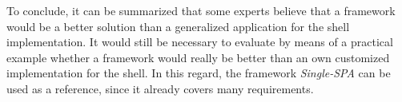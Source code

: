 To conclude, it can be summarized that some experts believe that a framework would be a better solution than a generalized application for the shell implementation.
It would still be necessary to evaluate by means of a practical example whether a framework would really be better than an own customized implementation for the shell.
In this regard, the framework \textit{Single-SPA} can be used as a reference, since it already covers many requirements.

